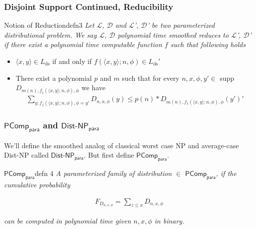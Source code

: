 \begin{frame}
    \frametitle{Disjoint Support Continued, Reducibility}

    \begin{define}{Notion of Reduction}{defn3}
        \textit{Let $\mathcal{L}$, $\mathcal{D}$ and $\mathcal{L}$', $\mathcal{D}$' be
            two parameterized distributional problem. We say $\mathcal{L}$, $\mathcal{D}$
            polynomial time smoothed reduces to $\mathcal{L}$', $\mathcal{D}$' if there exist
            a polynomial time computable function $f$ such that following holds}

    \end{define}

    \begin{itemize}
        \item $\langle x, y \rangle \in L_{\text{ds}}$ if and only if $f(\langle x, y \rangle; n, \phi) \in L_{\text{ds}}'$

        \item There exist a polynomial $p$ and $m$ such that for every $n, x, \phi, y' \in$
              supp $D_{m(n), f_1(\langle x, y \rangle; n, \phi), \phi}$ we have
              \begin{align*}
                  \displaystyle\sum_{y:f_1(\langle x, y \rangle; n, \phi), \phi = y'} D_{n,x,\phi} (y) \leq p(n) * D_{m(n), f_1(\langle x, y \rangle; n, \phi), \phi} (y')'
              \end{align*}
    \end{itemize}

\end{frame}

\begin{frame}
    \frametitle{$\textsf{PComp}_{\textsf{para}}$ and $\textsf{Dist-NP}_{\textsf{para}}$}

    We'll define the smoothed analog of classical worst case \textsf{NP} and
    average-case \textsf{Dist-NP} called $\textsf{Dist-NP}_{\textsf{para}}$. But first define $\textsf{PComp}_{\textsf{para}}$.

    \begin{define}{$\textsf{PComp}_{\textsf{para}}$}{defn 4}
        \textit{A parameterized family of distribution $\in$ $\textsf{PComp}_{\textsf{para}}$, if the cumulative probability}
        
        \begin{align*}
            F_{D_{n, x, \phi}} = \displaystyle\sum_{z \leq x} D_{n, x, \phi}
        \end{align*}

        \textit{can be computed in polynomial time given $n, x, \phi$ in binary.}
    \end{define}

\end{frame}

